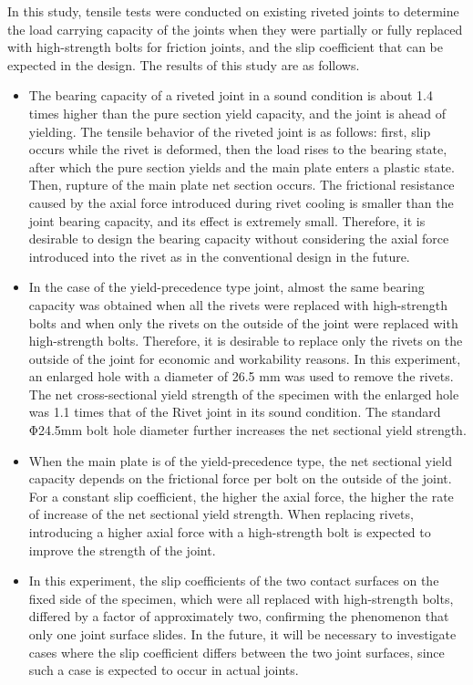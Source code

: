 In this study, tensile tests were conducted on existing riveted joints to determine the load carrying capacity of the joints when they were partially or fully replaced with high-strength bolts for friction joints, and the slip coefficient that can be expected in the design. The results of this study are as follows.

\begin{itemize}
    \item The bearing capacity of a riveted joint in a sound condition is about 1.4 times higher than the pure section yield capacity, and the joint is ahead of yielding. The tensile behavior of the riveted joint is as follows: first, slip occurs while the rivet is deformed, then the load rises to the bearing state, after which the pure section yields and the main plate enters a plastic state. Then, rupture of the main plate net section occurs. The frictional resistance caused by the axial force introduced during rivet cooling is smaller than the joint bearing capacity, and its effect is extremely small. Therefore, it is desirable to design the bearing capacity without considering the axial force introduced into the rivet as in the conventional design in the future.
    \item In the case of the yield-precedence type joint, almost the same bearing capacity was obtained when all the rivets were replaced with high-strength bolts and when only the rivets on the outside of the joint were replaced with high-strength bolts. Therefore, it is desirable to replace only the rivets on the outside of the joint for economic and workability reasons. In this experiment, an enlarged hole with a diameter of 26.5 mm was used to remove the rivets. The net cross-sectional yield strength of the specimen with the enlarged hole was 1.1 times that of the Rivet joint in its sound condition. The standard Φ24.5mm bolt hole diameter further increases the net sectional yield strength.
    \item When the main plate is of the yield-precedence type, the net sectional yield capacity depends on the frictional force per bolt on the outside of the joint. For a constant slip coefficient, the higher the axial force, the higher the rate of increase of the net sectional yield strength. When replacing rivets, introducing a higher axial force with a high-strength bolt is expected to improve the strength of the joint.
    \item In this experiment, the slip coefficients of the two contact surfaces on the fixed side of the specimen, which were all replaced with high-strength bolts, differed by a factor of approximately two, confirming the phenomenon that only one joint surface slides. In the future, it will be necessary to investigate cases where the slip coefficient differs between the two joint surfaces, since such a case is expected to occur in actual joints.
\end{itemize}